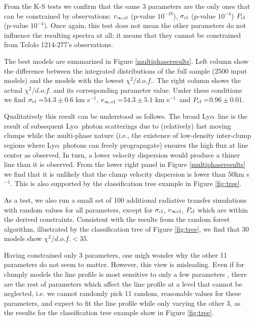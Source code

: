 \documentclass[a4,useAMS,usenatbib,usegraphicx]{mn2e}
\newcommand{\tol}{Tololo 1214-277}
\newcommand{\lya}{Ly$\alpha$}
\newcommand{\kms}{km s$^{-1}$}
\newcommand{\sigmaclump}{$54.3\pm 0.6$ km s$^{-1}$}
\newcommand{\inftyclump}{$54.3\pm 5.1$ km s$^{-1}$}
\newcommand{\probaclump}{$0.96\pm 0.01$}
\begin{document}
From the K-S tests we confirm that the same 3 parameters are the
only ones that can be constrained by observations;
$v_{\infty,\rm{cl}}$ (p-value  $10^{-18}$), $\sigma_{\rm cl}$ (p-value
$10^{-4}$) $P_{\rm cl}$ (p-value $10^{-4}$).
Once again, this test does not mean the other parameters do not
influence the resulting spectra at all; it means that they cannot be
constrained from \tol's observations. 


The best models are summarized in Figure \ref{multiphaseresults}.
Left column show the difference between the integrated distributions
of the full sample (2500 input models) and the models with the lowest
$\chi^2/d.o.f.$. 
The right column shows the actual $\chi^2/d.o.f.$ 
and its corresponding parameter value. 
Under these conditions we find $\sigma_{\rm cl}=$\sigmaclump,
$v_{\infty {\rm, cl}}=$\inftyclump\ and $P_{\rm cl}=$\probaclump. 

Qualitatively this result can be understood as follows. 
The broad \lya\ line is the result of subsequent \lya\ photon
scatterings due to (relatively) fast moving clumps while the
multi-phase nature (i.e., the existence of low-density inter-clump
regions where \lya\ photons can freely prograpagate)  ensures the high
flux at line center as observed.   
In turn, a lower velocity dispersion would produce a thiner line than
it is observed.
From the lower right panel in Figure \ref{multiphaseresults} we find that it
is unlikely that the clump velocity dispersion is lower than
$50$\kms. 
This is also supported by the classification tree example in Figure
\ref{fig:tree}.  

As a test, we also run a small set of 100 additional radiative
transfer simulations with random values for all parameters, except for
$\sigma_{\rm cl}$, $v_{\infty {\rm cl}}$, $P_{\rm cl}$ which are within the derived
constraints.
Consistent with the results from the random forest algorithm,
illustrated by the classification tree of Figure \ref{fig:tree}, we
find that $30$ models show $\chi^2/d.o.f.<35$.


Having constrained only 3 parameters, one migh wonder why the other 11
parameters do not seem to matter. 
However, this view is misleading. 
Even if for clumply models the line profile is most sensitive to only
a few parameters \citep{Gronke2016}, there are the rest of parameters
which affect the line profile at a level that cannot be neglected,
i.e. we cannot randomly pick 11 random, reasonable values for these
parameters, and expect to fit the line profile while only varying the
other 3, as the results for the classification tree example show in
Figure \ref{fig:tree}.
\end{document}
